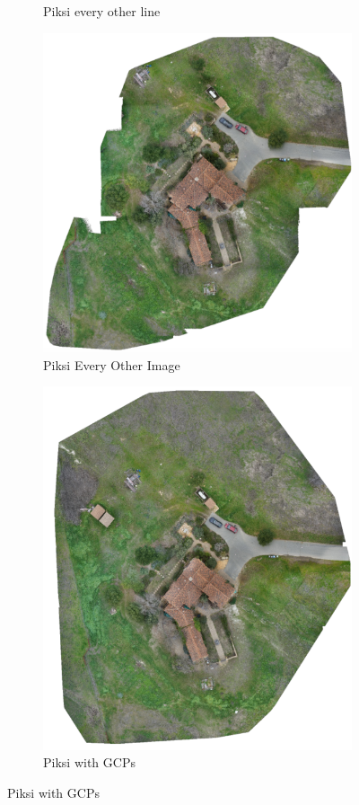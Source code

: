 \documentclass{article}
\begin{document}
\begin{figure}
\begin{subfigure}{.33\textwidth}
  \caption{Piksi every other line}
  \label{fig:sub2}
\end{subfigure}
\begin{subfigure}{.33\textwidth}
  \centering
  \includegraphics[width=.72\linewidth]{images/orthomosaics/p_every_other_image.png}
  \caption{Piksi Every Other Image}
  \label{fig:sub1}
\end{subfigure}%
\begin{subfigure}{.33\textwidth}
  \centering
  \includegraphics[width=.72\linewidth]{images/orthomosaics/p_gcp.png}
  \caption{Piksi with GCPs}
  \label{fig:sub1}
\end{subfigure}%

\end{figure}
\end{document}
